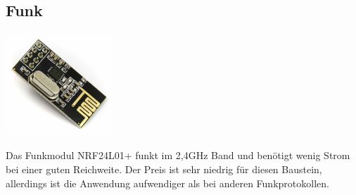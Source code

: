 \documentclass[
  12pt, %
  a4paper, %
  oneside, %
  openany, 
  numbers=noenddot, %
  BCOR=5mm, %
  parskip=half*, %
  thesis, %
]{bfhbook}
\newcommand{\compImgSize}{4cm}
\begin{document}
\subsection{Funk}
\begin{minipage}[t]{0.5\linewidth}\label{nrf24Radio}
        \includegraphics[width=\compImgSize, valign=t]{Bilder/NRF24.jpg} %
        \captionsetup{justification=raggedright}
\end{minipage}
\begin{minipage}[t]{0.5\linewidth}
Das Funkmodul NRF24L01+ \footnotemark funkt im 2,4GHz Band und benötigt wenig Strom bei einer guten Reichweite. Der Preis ist sehr niedrig für diesen Baustein, allerdings ist die Anwendung aufwendiger als bei anderen Funkprotokollen.
\end{minipage}

\listoffigures
\begingroup
\let\clearpage\relax
\listoftables
\printglossary
\end{document}
